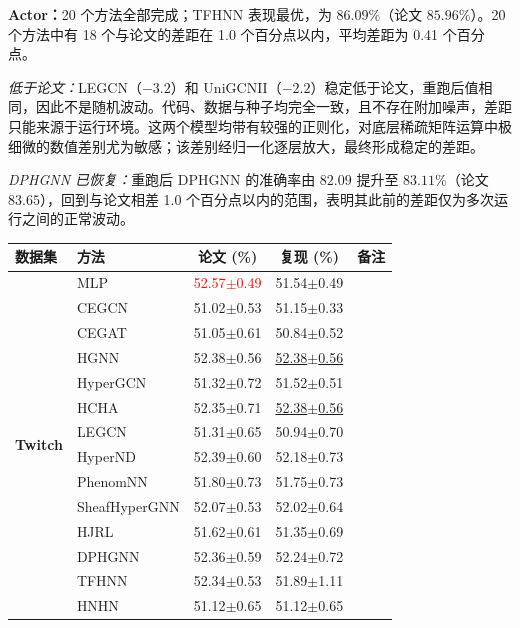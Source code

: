 \documentclass[11pt,a4paper]{article}
\begin{document}
\par\smallskip
\noindent\textbf{Actor：}20 个方法全部完成；TFHNN 表现最优，为 $86.09\%$（论文 $85.96\%$）。20 个方法中有 18 个与论文的差距在 1.0 个百分点以内，平均差距为 0.41 个百分点。

\noindent\textit{低于论文：}LEGCN（$-3.2$）和 UniGCNII（$-2.2$）稳定低于论文，重跑后值相同，因此不是随机波动。代码、数据与种子均完全一致，且不存在附加噪声，差距只能来源于运行环境。这两个模型均带有较强的正则化，对底层稀疏矩阵运算中极细微的数值差别尤为敏感；该差别经归一化逐层放大，最终形成稳定的差距。

\noindent\textit{DPHGNN 已恢复：}重跑后 DPHGNN 的准确率由 $82.09$ 提升至 $83.11\%$（论文 $83.65$），回到与论文相差 1.0 个百分点以内的范围，表明其此前的差距仅为多次运行之间的正常波动。

\begin{table}[H]
	\centering\small
	\begin{tabular}{llccc}
		\toprule
		数据集 & 方法 & 论文 (\%) & 复现 (\%) & 备注 \\
		\midrule
		\multirow{20}{*}{\textbf{Twitch}} & MLP               & \textcolor{red}{52.57$\pm$0.49}   & 51.54$\pm$0.49   &  \\
		 & CEGCN             & 51.02$\pm$0.53   & 51.15$\pm$0.33   &  \\
		 & CEGAT             & 51.05$\pm$0.61   & 50.84$\pm$0.52   &  \\
		 & HGNN              & 52.38$\pm$0.56   & \underline{52.38$\pm$0.56}   &  \\
		 & HyperGCN          & 51.32$\pm$0.72   & 51.52$\pm$0.51   &  \\
		 & HCHA              & 52.35$\pm$0.71   & \underline{52.38$\pm$0.56}   &  \\
		 & LEGCN             & 51.31$\pm$0.65   & 50.94$\pm$0.70   &  \\
		 & HyperND           & 52.39$\pm$0.60   & 52.18$\pm$0.73   &  \\
		 & PhenomNN          & 51.80$\pm$0.73   & 51.75$\pm$0.73   &  \\
		 & SheafHyperGNN     & 52.07$\pm$0.53   & 52.02$\pm$0.64   &  \\
		 & HJRL              & 51.62$\pm$0.61   & 51.35$\pm$0.69   &  \\
		 & DPHGNN            & 52.36$\pm$0.59   & 52.24$\pm$0.72   &  \\
		 & TFHNN             & 52.34$\pm$0.53   & 51.89$\pm$1.11   &  \\
		 & HNHN              & 51.12$\pm$0.65   & 51.12$\pm$0.65   &  \\

\end{tabular}
\end{table}
\end{document}
